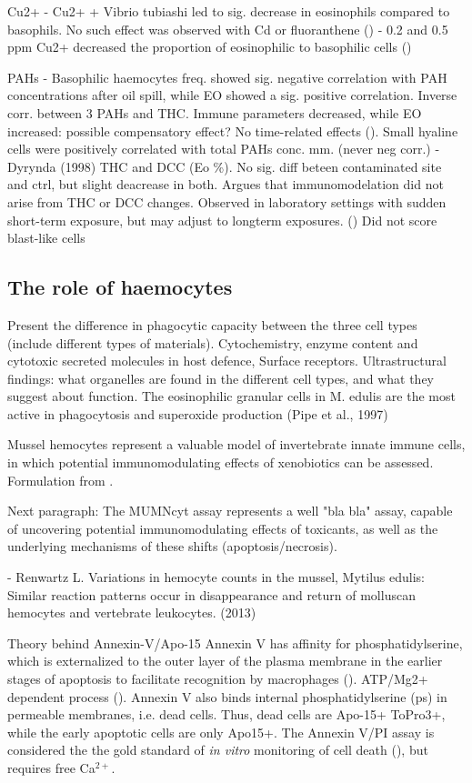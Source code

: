 Cu2+  
- Cu2+ + Vibrio tubiashi led to sig. decrease in eosinophils compared to basophils. No such effect was observed with Cd or fluoranthene (\cite{Pipe1995}) %
- 0.2 and 0.5 ppm Cu2+ decreased the proportion of eosinophilic to basophilic cells (\cite{Pipe1999})

  PAHs
- Basophilic haemocytes freq. showed sig. negative correlation with PAH concentrations after oil spill, while EO showed a sig. positive correlation. Inverse corr. between 3 PAHs and THC. Immune parameters decreased, while EO increased: possible compensatory effect? No time-related effects (\cite{Dyrynda1997}). Small hyaline cells were positively correlated with total PAHs conc. mm. (never neg corr.) %
- Dyrynda (1998) THC and DCC (Eo \%). No sig. diff beteen contaminated site and ctrl, but slight deacrease in both. Argues that immunomodelation did not arise from THC or DCC changes. Observed in laboratory settings with sudden short-term exposure, but may adjust to longterm exposures.  (\cite{Dyrynda1998}) Did not score blast-like cells %

\subsection{The role of haemocytes}
Present the difference in phagocytic capacity between the three cell types (include different types of materials).
Cytochemistry, enzyme content and cytotoxic secreted molecules in host defence, Surface receptors.
Ultrastructural findings: what organelles are found in the different cell types, and what they suggest about function.
The  eosinophilic granular cells in  M. edulis are the most active in phagocytosis and superoxide production (Pipe  et al., 1997)

Mussel hemocytes represent a valuable model of invertebrate innate immune cells, in which potential immunomodulating effects of xenobiotics can be assessed. Formulation from \cite{Rioult2014}.

Next paragraph: The MUMNcyt assay represents a well "bla bla" assay, capable of uncovering potential immunomodulating effects of toxicants, as well as the underlying mechanisms of these shifts (apoptosis/necrosis). 

- Renwartz L. Variations in hemocyte counts in the mussel, Mytilus edulis: Similar reaction patterns occur in disappearance and return of molluscan hemocytes and vertebrate leukocytes. (2013)

Theory behind Annexin-V/Apo-15 Annexin V has affinity for phosphatidylserine, which is externalized to the outer layer of the plasma membrane in the earlier stages of apoptosis to facilitate recognition by macrophages (\cite{Fadok1992}). ATP/Mg2+ dependent process (\cite{Connor1992}). Annexin V also binds internal phosphatidylserine (\acrshort{ps}) in permeable membranes, i.e. dead cells. Thus, dead cells are Apo-15+ ToPro3+, while the early apoptotic cells are only Apo15+. The Annexin V/PI assay is considered the the gold standard of \emph{in vitro} monitoring of cell death (\cite{Jiang2016}), but requires free Ca$^{2+}$.

